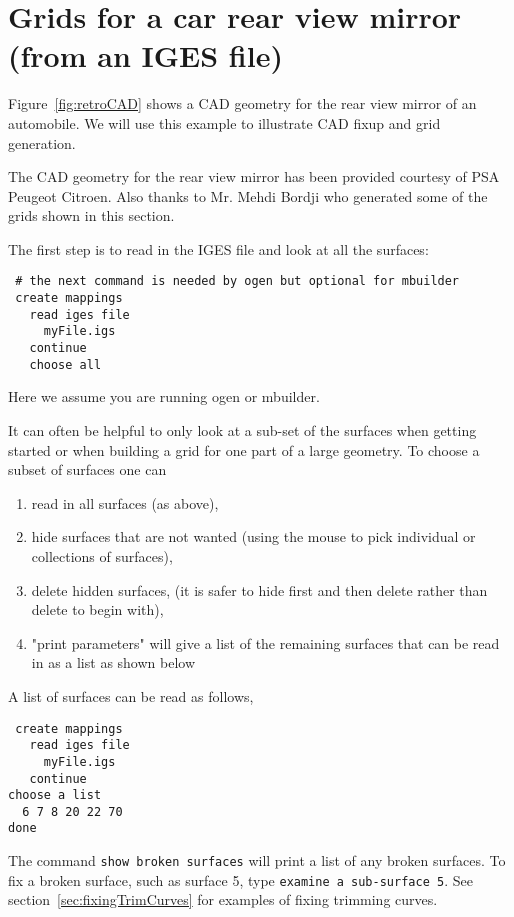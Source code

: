 \clearpage
\section{Grids for a car rear view mirror (from an IGES file)}\label{sec:retro}



Figure~\ref{fig:retroCAD} shows a CAD geometry for the rear view mirror of an
automobile. We will use this example to illustrate CAD fixup and grid generation.

The CAD geometry for the rear view mirror has been provided courtesy of PSA Peugeot Citroen.
Also thanks to Mr. Mehdi Bordji who generated some of the grids shown in this section.

 The first step is to read in the IGES file and look at all the
surfaces:
\begin{verbatim}
 # the next command is needed by ogen but optional for mbuilder
 create mappings
   read iges file
     myFile.igs
   continue
   choose all
\end{verbatim}
Here we assume you are running ogen or mbuilder.

It can often be helpful to only look at a sub-set of the surfaces when getting
started or when building a grid for one part of a large geometry. To choose
a subset of surfaces one can
\begin{enumerate}
  \item read in all surfaces (as above), 
  \item hide surfaces that are not wanted (using the mouse to pick individual or collections of surfaces),
  \item delete hidden surfaces, (it is safer to hide first and then delete rather than delete to begin with),
  \item "print parameters" will give a list of the remaining surfaces that can be 
        read in as a list as shown below
\end{enumerate}

 A list of surfaces can be read as follows,
\begin{verbatim}
 create mappings
   read iges file
     myFile.igs
   continue
choose a list
  6 7 8 20 22 70
done
\end{verbatim}

The command {\tt show broken surfaces} will print a list of any broken surfaces.
To fix a broken surface, such as surface 5, type {\tt examine a sub-surface 5}.
See section~\ref{sec:fixingTrimCurves} for examples of fixing trimming curves. 

